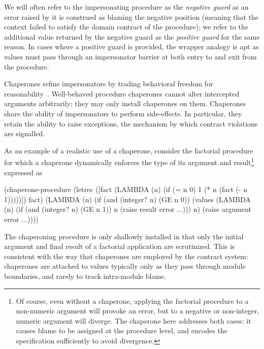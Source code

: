 We will often refer to the impersonating procedure as the \emph{negative guard} as an error raised by it is construed as blaming the negative position (meaning that the context failed to satisfy the domain contract of the procedure); we refer to the additional value returned by the negative guard as the \emph{positive guard} for the same reason.
In cases where a positive guard is provided, the wrapper analogy is apt as values must pass through an impersonator barrier at both entry to and exit from the procedure.

Chaperones refine impersonators by trading behavioral freedom for reasonability~\cite{strickland2012chaperones}.
Well-behaved procedure chaperones cannot alter intercepted arguments arbitrarily; they may only install chaperones on them.
Chaperones share the ability of impersonators to perform side-effects.
In particular, they retain the ability to raise exceptions, the mechanism by which contract violations are signalled.

As an example of a realistic use of a chaperone, consider the factorial procedure for which a chaperone dynamically enforces the type of its argument and result\footnote{Of course, even without a chaperone, applying the factorial procedure to a non-numeric argument will provoke an error, but to a negative or non-integer, numeric argument will diverge. The chaperone here addresses both cases: it causes blame to be assigned at the procedure level, and encodes the specification sufficiently to avoid divergence.} expressed as
\begin{schemedisplay}
(chaperone-procedure
 (letrec ([fact (LAMBDA (n)
                  (if (= n 0)
                      1
                      (* n (fact (- n 1)))))])
   fact)
 (LAMBDA (n)
   (if (and (integer? n) (GE n 0))
       (values (LAMBDA (n)
                 (if (and (integer? n) (GE n 1))
                     n
                     (raise result error ...)))
               n)
       (raise argument error ...))))
\end{schemedisplay}
The chaperoning procedure is only shallowly installed in that only the initial argument and final result of a factorial application are scrutinized.
This is consistent with the way that chaperones are employed by the contract system: chaperones are attached to values typically only as they pass through module boundaries, and rarely to track intra-module blame.

